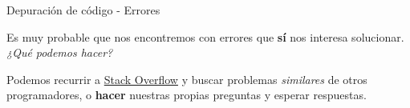 \begin{frame}[t]{Depuración de código - Errores}\vspace{10pt}

Es muy probable que nos encontremos con errores que \textbf{sí} nos interesa solucionar. \textit{¿Qué podemos hacer?}

\vspace{10pt}

Podemos recurrir a {\color{blue}\href{https://stackoverflow.com/}{Stack Overflow}} y buscar problemas \textit{similares} de otros programadores, o \textbf{hacer} nuestras propias preguntas y esperar respuestas.

\end{frame}